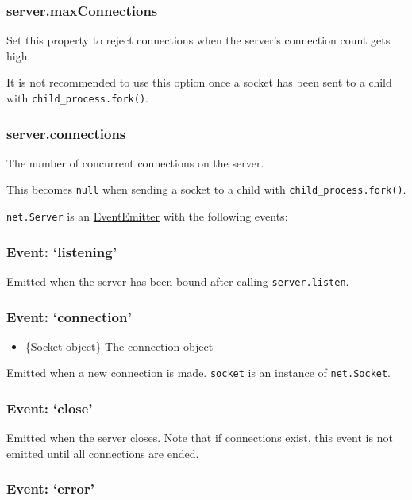 \subsubsection{server.maxConnections}

Set this property to reject connections when the server's connection
count gets high.

It is not recommended to use this option once a socket has been sent to
a child with \texttt{child\_process.fork()}.

\subsubsection{server.connections}

The number of concurrent connections on the server.

This becomes \texttt{null} when sending a socket to a child with
\texttt{child\_process.fork()}.

\texttt{net.Server} is an
\href{events.html\#events\_class\_events\_eventemitter}{EventEmitter}
with the following events:

\subsubsection{Event: `listening'}

Emitted when the server has been bound after calling
\texttt{server.listen}.

\subsubsection{Event: `connection'}

\begin{itemize}
\item
  \{Socket object\} The connection object
\end{itemize}

Emitted when a new connection is made. \texttt{socket} is an instance of
\texttt{net.Socket}.

\subsubsection{Event: `close'}

Emitted when the server closes. Note that if connections exist, this
event is not emitted until all connections are ended.

\subsubsection{Event: `error'}


